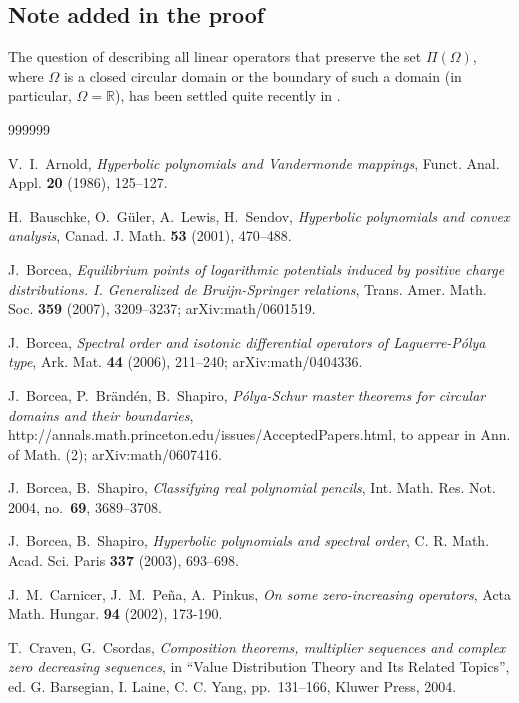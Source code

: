 \documentclass[10pt,twoside,a4paper,reqno]{amsart}
\theoremstyle{plain}
\theoremstyle{definition}
\theoremstyle{remark}
\newcommand {\bR} {\mathbb {R}}
\newcommand {\vP} {\varPi}
\begin{document}
\enlargethispage{0.2cm}

\subsection{Note added in the proof}

The question of describing all linear operators that preserve the set
$\vP(\Omega)$, where $\Omega$ is a closed circular domain or the boundary
of such a domain (in particular, $\Omega=\bR$), has been settled quite recently
in \cite{BBS}.

\begin{thebibliography}{999999}

V.~I.~Arnold, {\em Hyperbolic polynomials and Vandermonde mappings}, Funct. 
Anal. Appl. {\bf 20} (1986), 125--127.

H.~Bauschke, O.~G\"uler, A.~Lewis, H.~Sendov, {\em Hyperbolic polynomials 
and convex analysis}, Canad. J. Math. {\bf 53} (2001), 470--488.

J.~Borcea, {\em Equilibrium points of logarithmic potentials 
induced by positive charge distributions. I. Generalized de Bruijn-Springer 
relations}, Trans. Amer. Math. Soc. {\bf 359} (2007), 3209--3237; 
arXiv:math/0601519.

J.~Borcea, {\em Spectral order and isotonic differential operators 
of Laguerre-P\'olya type}, Ark. Mat. {\bf 44} (2006), 211--240; 
arXiv:math/0404336.

J.~Borcea, P.~Br\"and\'en, B.~Shapiro, {\em P\'olya-Schur master theorems for 
circular domains and their boundaries}, 
http://annals.math.princeton.edu/issues/AcceptedPapers.html,  
to appear in Ann. of Math. (2); arXiv:math/0607416. 

J.~Borcea, B.~Shapiro, {\em Classifying real polynomial pencils}, Int. Math. 
Res. Not. 2004, no.~{\bf 69}, 3689--3708.

J.~Borcea, B.~Shapiro, {\em Hyperbolic polynomials and spectral order}, 
C. R. Math. Acad. Sci. Paris {\bf 337} (2003), 693--698.

J.~M.~Carnicer, J.~M.~Pe\~{n}a, A.~Pinkus, {\em On some zero-increasing 
operators}, Acta Math. Hungar. {\bf 94} (2002), 173-190.

T.~Craven, G.~Csordas, {\em Composition theorems, multiplier sequences and 
complex zero decreasing sequences}, in ``Value Distribution 
Theory and Its Related Topics'', ed. G. Barsegian, I. Laine, C. C. Yang, 
pp.~131--166, Kluwer Press, 2004.


\end{thebibliography}
\end{document}
